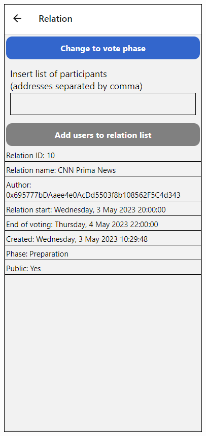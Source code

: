 \begin{figure}
\begin{minipage}{.5\textwidth}
  \label{fig:pridani_relace}
\end{minipage}%
\begin{minipage}{.5\textwidth}
  \centering
  \includegraphics[width=.9\linewidth]{obrazky/konkretni_relace.png}
  \label{fig:konkretni_relace}
\end{minipage}
\end{figure}

